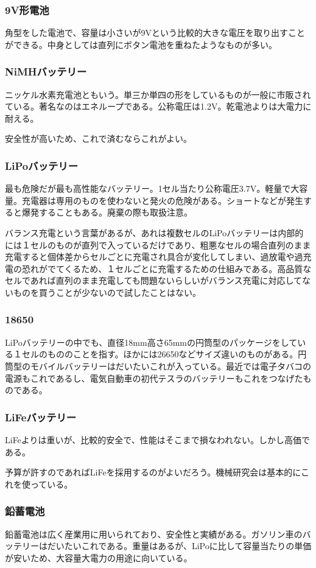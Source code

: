 \documentclass[a4paper,titlepage,here]{ujarticle}
\begin{document}
\subsubsection{9V形電池}
角型をした電池で、容量は小さいが9Vという比較的大きな電圧を取り出すことができる。中身としては直列にボタン電池を重ねたようなものが多い。
\subsubsection{NiMHバッテリー}
ニッケル水素充電池ともいう。単三か単四の形をしているものが一般に市販されている。著名なのはエネループである。公称電圧は1.2V。乾電池よりは大電力に耐える。

安全性が高いため、これで済むならこれがよい。
\subsubsection{LiPoバッテリー}
最も危険だが最も高性能なバッテリー。1セル当たり公称電圧3.7V。軽量で大容量。充電器は専用のものを使わないと発火の危険がある。ショートなどが発生すると爆発することもある。廃棄の際も取扱注意。

バランス充電という言葉があるが、あれは複数セルのLiPoバッテリーは内部的には１セルのものが直列で入っているだけであり、粗悪なセルの場合直列のまま充電すると個体差からセルごとに充電され具合が変化してしまい、過放電や過充電の恐れがでてくるため、１セルごとに充電するための仕組みである。高品質なセルであれば直列のまま充電しても問題ないらしいがバランス充電に対応してないものを買うことが少ないので試したことはない。
\subsubsection{18650}
LiPoバッテリーの中でも、直径18mm高さ65mmの円筒型のパッケージをしている１セルのもののことを指す。ほかには26650などサイズ違いのものがある。円筒型のモバイルバッテリーはだいたいこれが入っている。最近では電子タバコの電源もこれであるし、電気自動車の初代テスラのバッテリーもこれをつなげたものである。
\subsubsection{LiFeバッテリー}
LiFeよりは重いが、比較的安全で、性能はそこまで損なわれない。しかし高価である。

予算が許すのであればLiFeを採用するのがよいだろう。機械研究会は基本的にこれを使っている。
\subsubsection{鉛蓄電池}
鉛蓄電池は広く産業用に用いられており、安全性と実績がある。ガソリン車のバッテリーはだいたいこれである。重量はあるが、LiPoに比して容量当たりの単価が安いため、大容量大電力の用途に向いている。
\end{document}
